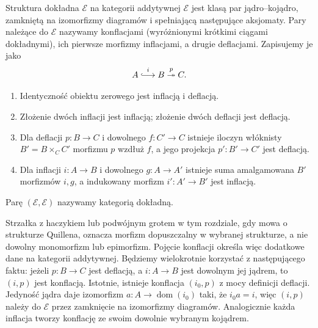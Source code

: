 \begin{definicja}\label{cat:def:quillen-exact}
Struktura dokładna $\mathscr E$ na kategorii addytywnej $\mathcal E$ jest klasą par jądro--kojądro, zamkniętą na izomorfizmy diagramów i spełniającą następujące aksjomaty. Pary należące do $\mathscr E$ nazywamy konflacjami (wyróżnionymi krótkimi ciągami dokładnymi), ich pierwsze morfizmy inflacjami, a drugie deflacjami. Zapisujemy je jako
\[
 A\overset{i}{\lhook\joinrel\longrightarrow}B
 \overset{p}{\twoheadrightarrow}C.
\]
\begin{enumerate}
 \item[(E0)] Identyczność obiektu zerowego jest inflacją i deflacją.
 \item[(E1)] Złożenie dwóch inflacji jest inflacją; złożenie dwóch deflacji jest deflacją.
 \item[(E2)] Dla deflacji $p:B\to C$ i dowolnego $f:C'\to C$ istnieje iloczyn włóknisty $B'=B\times_C C'$ morfizmu $p$ wzdłuż $f$, a jego projekcja $p':B'\to C'$ jest deflacją.
 \item[(E2$^{\mathrm{op}}$)] Dla inflacji $i:A\to B$ i dowolnego $g:A\to A'$ istnieje suma amalgamowana $B'$ morfizmów $i,g$, a indukowany morfizm $i':A'\to B'$ jest inflacją.
\end{enumerate}
Parę $(\mathcal E,\mathscr E)$ nazywamy kategorią dokładną.
\end{definicja}

Strzałka z haczykiem lub podwójnym grotem w tym rozdziale, gdy mowa o strukturze Quillena, oznacza morfizm dopuszczalny w wybranej strukturze, a nie dowolny monomorfizm lub epimorfizm. Pojęcie konflacji określa więc dodatkowe dane na kategorii addytywnej. Będziemy wielokrotnie korzystać z następującego faktu: jeżeli $p:B\to C$ jest deflacją, a $i:A\to B$ jest dowolnym jej jądrem, to $(i,p)$ jest konflacją. Istotnie, istnieje konflacja $(i_0,p)$ z mocy definicji deflacji. Jedyność jądra daje izomorfizm $a:A\to\operatorname{dom}(i_0)$ taki, że $i_0a=i$, więc $(i,p)$ należy do $\mathscr E$ przez zamknięcie na izomorfizmy diagramów. Analogicznie każda inflacja tworzy konflację ze swoim dowolnie wybranym kojądrem.

\begin{center}
\end{center}

